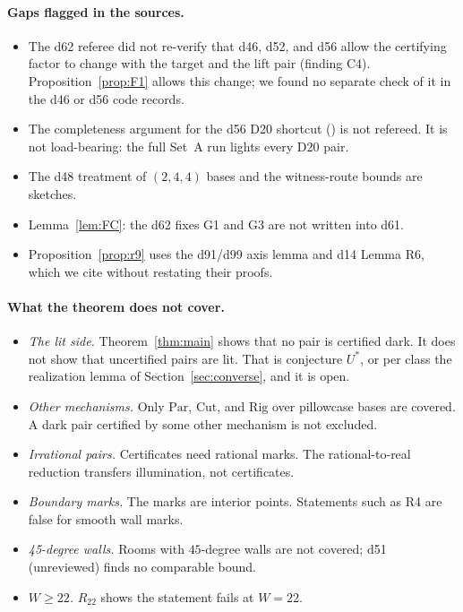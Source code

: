 \documentclass[11pt]{article}
\theoremstyle{definition}
\theoremstyle{remark}
\newcommand{\Par}{\mathrm{Par}}
\newcommand{\Rig}{\mathrm{Rig}}
\newcommand{\Cut}{\mathrm{Cut}}
\newcommand{\Rr}{R_{22}}
\newcommand{\src}[1]{\path{#1}}
\begin{document}
\paragraph{Gaps flagged in the sources.}
\begin{itemize}
\item The d62 referee did not re-verify that d46, d52, and d56 allow the
certifying factor to change with the target and the lift pair (finding C4).
Proposition~\ref{prop:F1} allows this change; we found no separate check of it
in the d46 or d56 code records.
\item The completeness argument for the d56 D20 shortcut
(\src{d56-final-check/shortcut/NOTES.md}) is not refereed. It is not load-bearing:
the full Set~A run lights every D20 pair.
\item The d48 treatment of $(2,4,4)$ bases and the witness-route bounds are
sketches.
\item Lemma~\ref{lem:FC}: the d62 fixes G1 and G3 are not written into d61.
\item Proposition~\ref{prop:r9} uses the d91/d99 axis lemma and d14 Lemma R6,
which we cite without restating their proofs.
\end{itemize}

\paragraph{What the theorem does not cover.}
\begin{itemize}
\item \emph{The lit side.} Theorem~\ref{thm:main} shows that no pair is
certified dark. It does not show that uncertified pairs are lit. That is
conjecture $U^*$, or per class the realization lemma of
Section~\ref{sec:converse}, and it is open.
\item \emph{Other mechanisms.} Only $\Par$, $\Cut$, and $\Rig$ over pillowcase
bases are covered. A dark pair certified by some other mechanism is not
excluded.
\item \emph{Irrational pairs.} Certificates need rational marks. The
rational-to-real reduction \cite{RR} transfers illumination, not certificates.
\item \emph{Boundary marks.} The marks are interior points. Statements such as
R4 are false for smooth wall marks.
\item \emph{45-degree walls.} Rooms with $45$-degree walls are not covered; d51
(unreviewed) finds no comparable bound.
\item \emph{$W\ge 22$.} $\Rr$ shows the statement fails at $W=22$.
\end{itemize}
\end{document}
